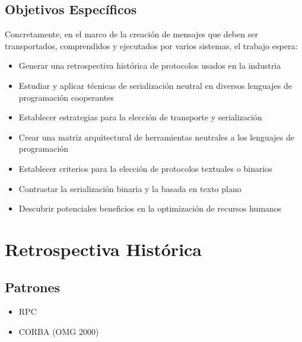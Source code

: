 \subsection{Objetivos Específicos}
Concretamente, en el marco de la creación de mensajes que deben ser transportados, comprendidos y ejecutados por varios sistemas, el trabajo espera:

\begin{itemize}
  \item Generar una retrospectiva histórica de protocolos usados en la industria
  \item Estudiar y aplicar técnicas de serialización neutral en diversos lenguajes de programación cooperantes
  \item Establecer estrategias para la elección de transporte y serialización
  \item Crear una matriz arquitectural de herramientas neutrales a los lenguajes de programación
  \item Establecer criterios para la elección de protocolos textuales o binarios
  \item Contrastar la serialización binaria y la basada en texto plano
  \item Descubrir potenciales beneficios en la optimización de recursos humanos
\end{itemize}

\section{Retrospectiva Histórica}

\subsection{Patrones}

\begin{itemize}
  \item RPC %
  \item CORBA (OMG 2000) %
\end{itemize}

